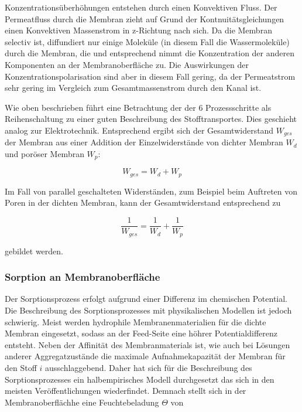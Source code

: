 \begin{normalsize}
\begin{LARGE}
  
Konzentrationsüberhöhungen entstehen durch einen Konvektiven Fluss. Der Permeatfluss durch die Membran zieht auf Grund der Kontnuitätsgleichungen einen Konvektiven Massenstrom in z-Richtung nach sich. Da die Membran selectiv ist, diffundiert nur einige Moleküle (in diesem Fall die Wassermoleküle) durch die Membran, die und entsprechend nimmt die Konzentration der anderen Komponenten an der Membranoberfläche zu. Die Auswirkungen der Konzentrationspolarisation sind aber in diesem Fall gering, da der Permeatstrom sehr gering im Vergleich zum Gesamtmassenstrom durch den Kanal ist. 

Wie oben beschrieben führt eine Betrachtung der der 6 Prozessschritte als Reihenschaltung zu einer guten Beschreibung des Stofftransportes. Dies geschieht analog zur Elektrotechnik. Entsprechend ergibt sich der Gesamtwiderstand $W_{ges}$ der Membran aus einer Addition der Einzelwiderstände von dichter Membran $W_{d}$ und poröser Membran $W_{p}$:

 \begin{equation}
 W_{ges} = W_{d} + W_{p}
\end{equation} 
 
Im Fall von parallel geschalteten Widerständen, zum Beispiel beim Auftreten von Poren in der dichten Membran, kann der Gesamtwiderstand entsprechend zu 

\begin{equation}
\frac{1}{W_{ges}} = \frac{1}{W_{d}} + \frac{1}{W_{p}}
\end{equation}

gebildet werden. 


\subsubsection{Sorption an Membranoberfläche}

Der Sorptionsprozess erfolgt aufgrund einer Differenz im chemischen Potential. Die Beschreibung des Sorptionsprozesses mit physikalischen Modellen ist jedoch schwierig. Meist werden hydrophile Membranenmaterialien für die dichte Membran eingesetzt, sodass an der Feed-Seite eine höhrer Potentialdifferenz entsteht. Neben der Affinität des Membranmaterials ist, wie auch bei Lösungen anderer Aggregatzustände die maximale Aufnahmekapazität der Membran für den Stoff $i$ ausschlaggebend. Daher hat sich für die Beschreibung des Sorptionsprozesses ein halbempirisches Modell durchgesetzt das sich in den meisten Veröffentlichungen wiederfindet. Demnach stellt sich in der Membranoberflächhe eine Feuchtebeladung $\Theta$ von 


\end{LARGE}
\end{normalsize}
